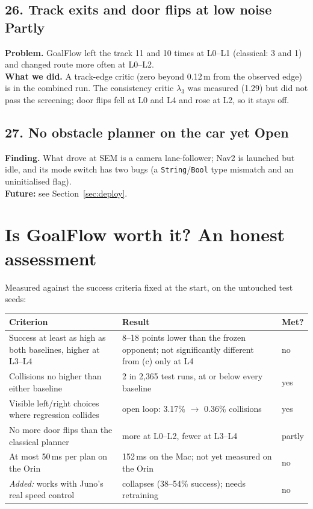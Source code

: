 \documentclass[11pt,a4paper]{article}
\newcommand{\code}[1]{\texttt{#1}}
\newcommand{\partly}{\textcolor{accent}{\textbf{Partly}}}
\newcommand{\open}{\textcolor{warn}{\textbf{Open}}}
\begin{document}
\subsection*{26. Track exits and door flips at low noise \hfill\partly}
\textbf{Problem.} GoalFlow left the track 11 and 10 times at L0--L1 (classical: 3 and 1) and changed route more often at
L0--L2.\\
\textbf{What we did.} A track-edge critic (zero beyond 0.12\,m from the observed edge) is in the combined run. The
consistency critic $\lambda_3$ was measured (1.29) but did not pass the screening; door flips fell at L0 and L4 and rose
at L2, so it stays off.

\subsection*{27. No obstacle planner on the car yet \hfill\open}
\textbf{Finding.} What drove at SEM is a camera lane-follower; Nav2 is launched but idle, and its mode switch has two
bugs (a \code{String}/\code{Bool} type mismatch and an uninitialised flag).\\
\textbf{Future:} see Section~\ref{sec:deploy}.

\section{Is GoalFlow worth it? An honest assessment}
\label{sec:assessment}
Measured against the success criteria fixed at the start, on the untouched test seeds:
\begin{table}[H]
\small
\begin{tabularx}{\linewidth}{@{}LLl@{}}
\toprule
Criterion & Result & Met? \\
\midrule
Success at least as high as both baselines, higher at L3--L4 & 8--18 points lower than the frozen opponent; not significantly different from (c) only at L4 & no \\
Collisions no higher than either baseline & 2 in 2{,}365 test runs, at or below every baseline & yes \\
Visible left/right choices where regression collides & open loop: 3.17\% $\to$ 0.36\% collisions & yes \\
No more door flips than the classical planner & more at L0--L2, fewer at L3--L4 & partly \\
At most 50\,ms per plan on the Orin & 152\,ms on the Mac; not yet measured on the Orin & no \\
\emph{Added:} works with Juno's real speed control & collapses (38--54\% success); needs retraining & no \\
\bottomrule
\end{tabularx}
\end{table}
\end{document}

